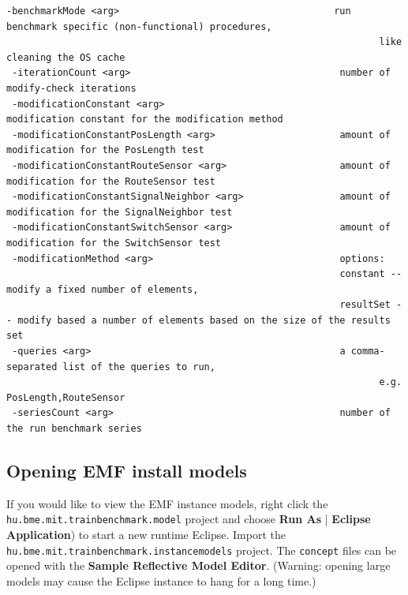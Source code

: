 \begin{lstlisting}[keywordstyle=\ttfamily]
 -benchmarkMode <arg>                                      run benchmark specific (non-functional) procedures,
                                                                  like cleaning the OS cache
 -iterationCount <arg>                                     number of modify-check iterations
 -modificationConstant <arg>                               modification constant for the modification method
 -modificationConstantPosLength <arg>                      amount of modification for the PosLength test
 -modificationConstantRouteSensor <arg>                    amount of modification for the RouteSensor test
 -modificationConstantSignalNeighbor <arg>                 amount of modification for the SignalNeighbor test
 -modificationConstantSwitchSensor <arg>                   amount of modification for the SwitchSensor test
 -modificationMethod <arg>                                 options:
                                                           constant -- modify a fixed number of elements,
                                                           resultSet -- modify based a number of elements based on the size of the results set
 -queries <arg>                                            a comma-separated list of the queries to run,
                                                                  e.g. PosLength,RouteSensor
 -seriesCount <arg>                                        number of the run benchmark series
\end{lstlisting}

\subsection{Opening EMF install models}

If you would like to view the EMF instance models, right click the \texttt{hu.bme.mit.trainbenchmark.model} project and choose \textbf{Run As} | \textbf{Eclipse Application}) to start a new runtime Eclipse. Import the \texttt{hu.bme.mit.trainbenchmark.instancemodels} project. The \texttt{concept} files can be opened with the \textbf{Sample Reflective Model Editor}. (Warning: opening large models may cause the Eclipse instance to hang for a long time.)